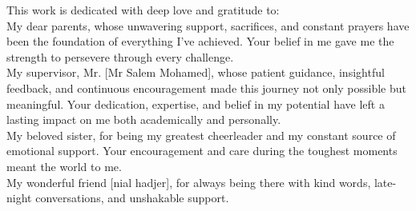\thispagestyle{empty}
\vskip15mm
\begin{center}
\end{center}
\vfill 
\begin{center}
	\parbox{.85\linewidth}{\centering 
		\baselineskip=8mm 
		\selectfont 
		\Large 
This work is dedicated with deep love and gratitude to:
\\[5mm]
My dear parents,
whose unwavering support, sacrifices, and constant prayers have been the foundation of everything I’ve achieved. Your belief in me gave me the strength to persevere through every challenge.
\\[5mm]
My supervisor, Mr. [Mr Salem Mohamed],
whose patient guidance, insightful feedback, and continuous encouragement made this journey not only possible but meaningful. Your dedication, expertise, and belief in my potential have left a lasting impact on me both academically and personally.
\\[5mm]
My beloved sister,
for being my greatest cheerleader and my constant source of emotional support. Your encouragement and care during the toughest moments meant the world to me.
\\[5mm]
My wonderful friend [nial hadjer],
for always being there with kind words, late-night conversations, and unshakable support.
\\[19mm]
}
\end{center}
\vfill 
\thispagestyle{empty}